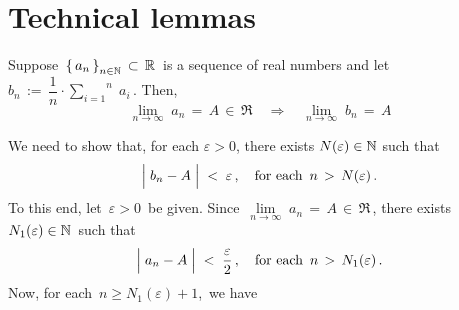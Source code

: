 

\section{Technical lemmas}
\setcounter{theorem}{0}
\setcounter{equation}{0}


\renewcommand{\theenumi}{\roman{enumi}}
\renewcommand{\labelenumi}{\textnormal{(\theenumi)}$\;\;$}


\begin{lemma}\label{lemma:SequenceOfPartialMeans}
\mbox{}\vskip 0.1cm
\noindent
Suppose \,$\left\{\,a_{n}\,\right\}_{n\in\mathbb{N}}\,\subset\,\mathbb{R}$\, is a sequence of real numbers and let
\,$b_{n} \, := \, \dfrac{1}{n}\cdot\overset{n}{\underset{i=1}{\sum}}\;a_{i}$\,.
Then,
\begin{equation*}
\underset{n\rightarrow\infty}{\lim}\;a_{n} \,=\, A \,\in\, \Re
\quad\Longrightarrow\quad
\underset{n\rightarrow\infty}{\lim}\;b_{n} \,=\, A
\end{equation*}
\end{lemma}
\proof
We need to show that, for each $\varepsilon > 0$, there exists $N(\varepsilon) \in \mathbb{N}$ such that
\begin{equation*}
\left\vert\;b_{n} - \overset{{\color{white}.}}{A}\;\right\vert \; < \; \varepsilon\,,
\quad
\textnormal{for each \,$n \,>\, N(\varepsilon)$}\,.
\end{equation*}
To this end, let \,$\varepsilon > 0$\, be given.
Since \,$\underset{n\rightarrow\infty}{\lim}\;a_{n} \,=\, A \,\in\, \Re$\,,
there exists \,$N_{1}(\varepsilon) \in \mathbb{N}$\, such that
\begin{equation*}
\left\vert\;a_{n} - \overset{{\color{white}.}}{A}\;\right\vert \; < \; \dfrac{\varepsilon}{2}\,,
\quad
\textnormal{for each \,$n \,>\, N_{1}(\varepsilon)$}\,.
\end{equation*}
Now, for each \,$n \geq N_{1}(\varepsilon)+1$,\, we have
